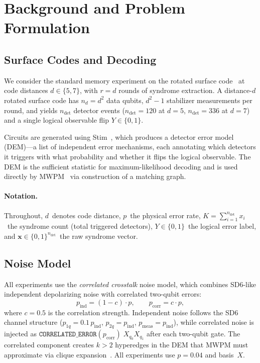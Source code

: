 
\section{Background and Problem Formulation}
\label{sec:background}

\subsection{Surface Codes and Decoding}

We consider the standard memory experiment on the rotated surface code~\cite{PLACEHOLDER_surface_code} at code distances $d \in \{5, 7\}$, with $r = d$ rounds of syndrome extraction. A distance-$d$ rotated surface code has $n_d = d^2$ data qubits, $d^2 - 1$ stabilizer measurements per round, and yields $n_{\mathrm{det}}$ detector events ($n_{\mathrm{det}} = 120$ at $d{=}5$, $n_{\mathrm{det}} = 336$ at $d{=}7$) and a single logical observable flip $Y \in \{0, 1\}$.

Circuits are generated using Stim~\cite{PLACEHOLDER_stim}, which produces a detector error model (DEM)---a list of independent error mechanisms, each annotating which detectors it triggers with what probability and whether it flips the logical observable. The DEM is the sufficient statistic for maximum-likelihood decoding and is used directly by MWPM~\cite{PLACEHOLDER_pymatching} via construction of a matching graph.

\paragraph{Notation.} Throughout, $d$~denotes code distance, $p$~the physical error rate, $K = \sum_{i=1}^{n_{\mathrm{det}}} x_i$~the syndrome count (total triggered detectors), $Y \in \{0,1\}$~the logical error label, and $\mathbf{x} \in \{0,1\}^{n_{\mathrm{det}}}$~the raw syndrome vector.

\subsection{Noise Model}

All experiments use the \emph{correlated crosstalk} noise model, which combines SD6-like independent depolarizing noise with correlated two-qubit errors:
\begin{equation}
p_{\text{ind}} = (1 - c) \cdot p, \qquad p_{\text{corr}} = c \cdot p,
\end{equation}
where $c = 0.5$ is the correlation strength. Independent noise follows the SD6 channel structure ($p_{1q} = 0.1\,p_{\text{ind}}$, $p_{2q} = p_{\text{ind}}$, $p_{\text{meas}} = p_{\text{ind}}$), while correlated noise is injected as $\texttt{CORRELATED\_ERROR}(p_{\text{corr}})\; X_{q_0} X_{q_1}$ after each two-qubit gate. The correlated component creates $k{>}2$ hyperedges in the DEM that MWPM must approximate via clique expansion~\cite{PLACEHOLDER_correlated_decoding}. All experiments use $p = 0.04$ and basis~$X$.


